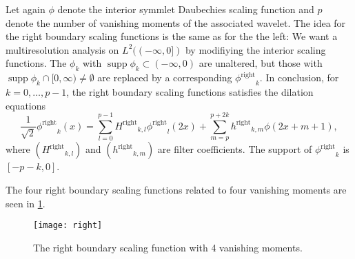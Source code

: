 \documentclass[a4paper]{scrartcl}
\newcommand\rphi{\ensuremath{\phi^{\text{right}}}}
\newcommand\rH{\ensuremath{H^{\text{right}}}}
\newcommand\rh{\ensuremath{h^{\text{right}}}}
\DeclareMathOperator\supp{supp}
\begin{document}
Let again $\phi$ denote the interior symmlet Daubechies scaling function and $p$ denote the number of vanishing moments of the associated wavelet.
The idea for the right boundary scaling functions is the same as for the the left:
We want a multiresolution analysis on $L^2((-\infty,0])$ by modifiying the interior scaling functions.
The $\phi_k$ with $\supp\phi_k \subset (-\infty,0)$ are unaltered, but those with $\supp\phi_k \cap [0, \infty) \neq \emptyset$ are replaced by a corresponding $\rphi_k$.
In conclusion, for $k=0,\ldots,p-1$, the right boundary scaling functions satisfies the dilation equations
\begin{equation}
	\label{eq:right_scaling_function_definition}
	\frac1{\sqrt2} \rphi_k(x)
	= \sum_{l=0}^{p-1} \rH_{k,l} \rphi_l(2x) + \sum_{m=p}^{p+2k} \rh_{k,m} \phi(2x+m+1),
\end{equation}
where $(\rH_{k,l})$ and $(\rh_{k,m})$ are filter coefficients.
The support of $\rphi_k$ is $[-p-k,0]$.

The four right boundary scaling functions related to four vanishing moments are seen in \cref{fig:right_Daubechies4}.

\begin{figure}
	\centering
	\texttt{[image: right]}
	\caption{The right boundary scaling function with 4 vanishing moments.}
	\label{fig:right_Daubechies4}
\end{figure}


\printbibliography
\end{document}
